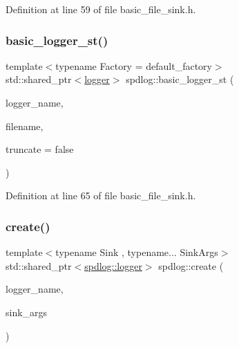 Definition at line 59 of file basic\+\_\+file\+\_\+sink.\+h.

\mbox{\label{namespacespdlog_abc9cd0646191cc0b295b6e50367b22b7}} 
\subsubsection{\texorpdfstring{basic\+\_\+logger\+\_\+st()}{basic\_logger\_st()}}
{\footnotesize\ttfamily template$<$typename Factory  = default\+\_\+factory$>$ \\
std\+::shared\+\_\+ptr$<$\hyperlink{classspdlog_1_1logger}{logger}$>$ spdlog\+::basic\+\_\+logger\+\_\+st (\begin{DoxyParamCaption}\item[{const std\+::string \&}]{logger\+\_\+name,  }\item[{const \hyperlink{namespacespdlog_acf7ce125b3622e44f8f1702d699e0b06}{filename\+\_\+t} \&}]{filename,  }\item[{bool}]{truncate = {\ttfamily false} }\end{DoxyParamCaption})\hspace{0.3cm}{\ttfamily [inline]}}



Definition at line 65 of file basic\+\_\+file\+\_\+sink.\+h.

\mbox{\label{namespacespdlog_a852b420dc3dd5e5193a21f61f8577e62}} 
\subsubsection{\texorpdfstring{create()}{create()}}
{\footnotesize\ttfamily template$<$typename Sink , typename... Sink\+Args$>$ \\
std\+::shared\+\_\+ptr$<$\hyperlink{classspdlog_1_1logger}{spdlog\+::logger}$>$ spdlog\+::create (\begin{DoxyParamCaption}\item[{std\+::string}]{logger\+\_\+name,  }\item[{Sink\+Args \&\&...}]{sink\+\_\+args }\end{DoxyParamCaption})\hspace{0.3cm}{\ttfamily [inline]}}



